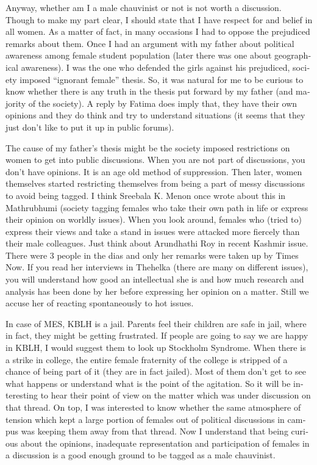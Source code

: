 \begin{english}
Anyway, whether am I a male chauvinist or not is not worth a discussion. Though to make my part clear, 
I should state that I have respect for and belief in all women. As a matter of fact, in many occasions I 
had to oppose the prejudiced remarks about them. Once I had an argument with my father about political 
awareness among female student population (later there was one about geographical awareness). I was 
the one who defended the girls against his prejudiced, society imposed “ignorant female” thesis. So, 
it was natural for me to be curious to know whether there is any truth in the thesis put forward by my father 
(and majority of the society). A reply by Fatima does imply that, they have their own opinions and they do 
think and try to understand situations (it seems that they just don't like to put it up in public forums).

The cause of my father's thesis might be the society imposed restrictions on women to get into public 
discussions. When you are not part of discussions, you don't have opinions. It is an age old method of 
suppression. Then later, women themselves started restricting themselves from being a part of messy 
discussions to avoid being tagged. I think Sreebala K. Menon once wrote about this in Mathrubhumi 
(society tagging females who take their own path in life or express their opinion on worldly issues). 
When you look around, females who (tried to) express their views and take a stand in issues were 
attacked more fiercely than their male colleagues. Just think about Arundhathi Roy in recent Kashmir 
issue. There were 3 people in the dias and only her remarks were taken up by Times Now. If you read 
her interviews in Thehelka (there are many on different issues), you will understand how good an intellectual 
she is and how much research and analysis has been done by her before expressing her opinion on a 
matter. Still we accuse her of reacting spontaneously to hot issues.

In case of MES, KBLH is a jail. Parents feel their children are safe in jail, where in fact, they might be 
getting frustrated. If people are going to say we are happy in KBLH, I would suggest them to look up 
Stockholm Syndrome. When there is a strike in college, the entire female fraternity of the college is 
stripped of a chance of being part of it (they are in fact jailed). Most of them don't get to see 
what happens or understand what is the point of the agitation. So it will be interesting to hear 
their point of view on the matter which was under discussion on that thread. On top, I was interested 
to know whether the same atmosphere of tension which kept a large portion of females out of 
political discussions in campus was keeping them away from that thread. Now I understand that 
being curious about the opinions, inadequate representation and participation of females in a discussion 
is a good enough ground to be tagged as a male chauvinist.


\end{english}
